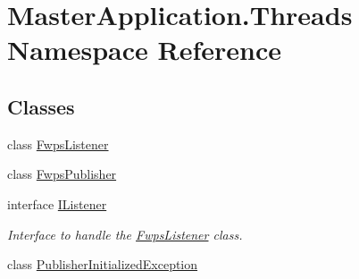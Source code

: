 \hypertarget{namespace_master_application_1_1_threads}{}\section{Master\+Application.\+Threads Namespace Reference}
\label{namespace_master_application_1_1_threads}
\subsection*{Classes}
\begin{DoxyCompactItemize}
\item 
class \mbox{\hyperlink{class_master_application_1_1_threads_1_1_fwps_listener}{Fwps\+Listener}}
\item 
class \mbox{\hyperlink{class_master_application_1_1_threads_1_1_fwps_publisher}{Fwps\+Publisher}}
\item 
interface \mbox{\hyperlink{interface_master_application_1_1_threads_1_1_i_listener}{I\+Listener}}
\begin{DoxyCompactList}\small\item\em Interface to handle the \mbox{\hyperlink{class_master_application_1_1_threads_1_1_fwps_listener}{Fwps\+Listener}} class. \end{DoxyCompactList}\item 
class \mbox{\hyperlink{class_master_application_1_1_threads_1_1_publisher_initialized_exception}{Publisher\+Initialized\+Exception}}
\end{DoxyCompactItemize}
